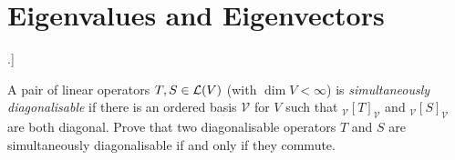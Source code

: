 \documentclass[article, a4paper, 11pt, oneside]{memoir}
\numberwithin{equation}{chapter}
\renewenvironment{exerciseframed}[1][]{%
    \setsepchar{.}%
    \readlist*\mylist{#1}%
    \def\exlabel{\mylist[1].\mylist[2]}%
    \begin{exerciseframed*}[\exlabel]%
    \label{ex:#1}%
}{%
    \end{exerciseframed*}%
}
\theoremstyle{nonumberplain}
\begin{document}
\addtocounter{chapter}{4}
\chapter{Eigenvalues and Eigenvectors}

\newcommand{\calV}{\mathcal{V}}
\newcommand{\mr}[3]{{}_{#1}[#2]_{#3}}
\newcommand{\spec}{\operatorname{Spec}}

\begin{exerciseframed}[8.21]
    A pair of linear operators $T,S \in \mathcal{L}(V)$ (with $\dim V < \infty$) is \emph{simultaneously diagonalisable} if there is an ordered basis $\calV$ for $V$ such that $\mr{\calV}{T}{\calV}$ and $\mr{\calV}{S}{\calV}$ are both diagonal. Prove that two diagonalisable operators $T$ and $S$ are simultaneously diagonalisable if and only if they commute.
\end{exerciseframed}

\newenvironment{displaytheorem}{%
	\begin{displayquote}\itshape%
}{%
	\end{displayquote}%
}
\end{document}
